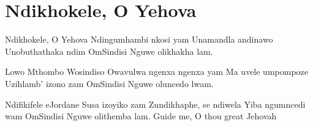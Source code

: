 \starttocol
\chapter{Ndikhokele, O Yehova}
\nexttocol
\hfill{\it }
\stoptocol
\starttocol
\startlines
{\sc Ndikhokele}, O Yehova
Ndingumhambi nkosi yam
Unamandla andinawo
Unobuthathaka ndim
OmSindisi
Nguwe olikhakha lam.

Lowo Mthombo Wosindiso
Owavulwa ngenxa ngenxa yam
Ma uvele umpompoze
Uzihlamb' izono zam
OmSindisi
Nguwe oluncedo lwam.

Ndifikifele eJordane
Susa izoyiko zam
Zundikhaphe, se ndiwela
Yiba ngumncedi wam
OmSindisi
Nguwe olithemba lam.
\stoplines
\nexttocol
\startlines
Guide me, 
\hfill   O thou great Jehovah
\stoplines
\stoptocol
